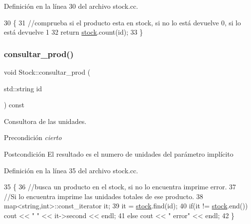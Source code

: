 Definición en la línea 30 del archivo stock.\+cc.


\begin{DoxyCode}
30                                          \{
31     \textcolor{comment}{//comprueba si el producto esta en stock, si no lo está devuelve 0, si lo está devuelve 1}
32     \textcolor{keywordflow}{return} \mbox{\hyperlink{class_stock_a55cb69748a14da5fe525e55a2c656ba9}{stock}}.count(\textcolor{keywordtype}{id});
33 \}
\end{DoxyCode}
\mbox{\label{class_stock_aadb2f269b75da29388c0e8b7055b44ce}} 
\subsubsection{\texorpdfstring{consultar\+\_\+prod()}{consultar\_prod()}}
{\footnotesize\ttfamily void Stock\+::consultar\+\_\+prod (\begin{DoxyParamCaption}\item[{std\+::string}]{id }\end{DoxyParamCaption}) const}



Consultora de las unidades. 

\begin{DoxyPrecond}{Precondición}
{\itshape cierto} 
\end{DoxyPrecond}
\begin{DoxyPostcond}{Postcondición}
El resultado es el numero de unidades del parámetro implícito 
\end{DoxyPostcond}


Definición en la línea 35 del archivo stock.\+cc.


\begin{DoxyCode}
35                                           \{
36     \textcolor{comment}{//busca un producto en el stock, si no lo encuentra imprime error.}
37     \textcolor{comment}{//Si lo encuentra imprime las unidades totales de ese producto.}
38     map<string,int>::const\_iterator it;
39     it = \mbox{\hyperlink{class_stock_a55cb69748a14da5fe525e55a2c656ba9}{stock}}.find(\textcolor{keywordtype}{id});
40     \textcolor{keywordflow}{if}(it != \mbox{\hyperlink{class_stock_a55cb69748a14da5fe525e55a2c656ba9}{stock}}.end()) cout << \textcolor{stringliteral}{"  "} << it->second << endl;
41     \textcolor{keywordflow}{else} cout << \textcolor{stringliteral}{"  error"} << endl;
42 \}
\end{DoxyCode}
\mbox{\label{class_stock_ab92820b495a64f2a7aef5b071644909a}} 
